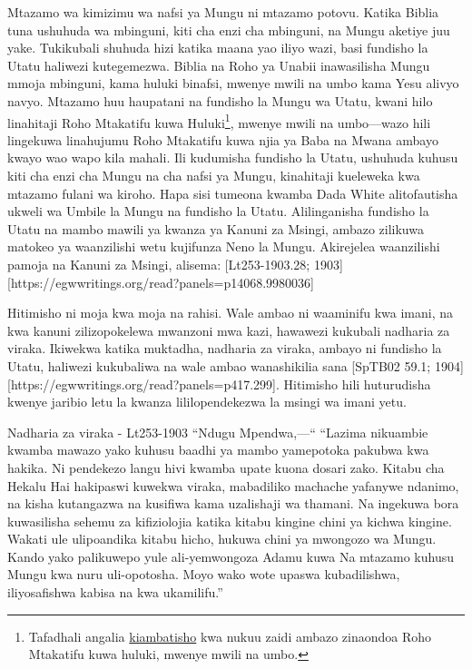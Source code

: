 Mtazamo wa kimizimu wa nafsi ya Mungu ni mtazamo potovu. Katika Biblia tuna ushuhuda wa mbinguni, kiti cha enzi cha mbinguni, na Mungu aketiye juu yake. Tukikubali shuhuda hizi katika maana yao iliyo wazi, basi fundisho la Utatu haliwezi kutegemezwa. Biblia na Roho ya Unabii inawasilisha Mungu mmoja mbinguni, kama huluki binafsi, mwenye mwili na umbo kama Yesu alivyo navyo. Mtazamo huu haupatani na fundisho la Mungu wa Utatu, kwani hilo linahitaji Roho Mtakatifu kuwa Huluki\footnote{Tafadhali angalia \hyperref[appendix:unauthenticated-reports]{kiambatisho} kwa nukuu zaidi ambazo zinaondoa Roho Mtakatifu kuwa huluki, mwenye mwili na umbo.}, mwenye mwili na umbo—wazo hili lingekuwa linahujumu Roho Mtakatifu kuwa njia ya Baba na Mwana ambayo kwayo wao wapo kila mahali. Ili kudumisha fundisho la Utatu, ushuhuda kuhusu kiti cha enzi cha Mungu na cha nafsi ya Mungu, kinahitaji kueleweka kwa mtazamo fulani wa kiroho. Hapa sisi tumeona kwamba Dada White alitofautisha ukweli wa Umbile la Mungu na fundisho la Utatu. Alilinganisha fundisho la Utatu na mambo mawili ya kwanza ya Kanuni za Msingi, ambazo zilikuwa matokeo ya waanzilishi wetu kujifunza Neno la Mungu. Akirejelea waanzilishi pamoja na Kanuni za Msingi, alisema: [Lt253-1903.28; 1903][https://egwwritings.org/read?panels=p14068.9980036]

Hitimisho ni moja kwa moja na rahisi. Wale ambao ni waaminifu kwa imani, na kwa kanuni zilizopokelewa mwanzoni mwa kazi, hawawezi kukubali nadharia za viraka. Ikiwekwa katika muktadha, nadharia za viraka, ambayo ni fundisho la Utatu, haliwezi kukubaliwa na wale ambao wanashikilia sana [SpTB02 59.1; 1904][https://egwwritings.org/read?panels=p417.299]. Hitimisho hili huturudisha kwenye jaribio letu la kwanza lililopendekezwa la msingi wa imani yetu.



Nadharia za viraka - Lt253-1903
“Ndugu Mpendwa,—“
“Lazima nikuambie kwamba mawazo yako kuhusu baadhi ya mambo yamepotoka pakubwa kwa hakika. Ni pendekezo langu hivi kwamba upate kuona dosari zako. Kitabu cha Hekalu Hai hakipaswi kuwekwa viraka, mabadiliko machache yafanywe ndanimo, na kisha kutangazwa na kusifiwa kama uzalishaji wa thamani. Na ingekuwa bora kuwasilisha sehemu za kifiziolojia katika kitabu kingine chini ya kichwa kingine. Wakati ule ulipoandika kitabu hicho, hukuwa chini ya mwongozo wa Mungu. Kando yako palikuwepo yule ali-yemwongoza Adamu kuwa Na mtazamo kuhusu Mungu kwa nuru uli-opotosha. Moyo wako wote upaswa kubadilishwa, iliyosafishwa kabisa na kwa ukamilifu.”
